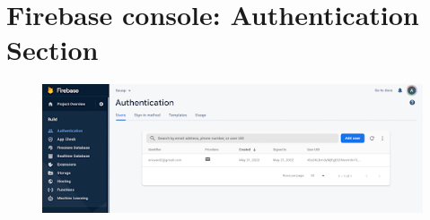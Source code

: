 \chapter{Firebase console: Authentication Section}\label{app:B}
\label{app:appendixB}


\begin{figure}[h]
    \centering
    \includegraphics[scale=0.9]{figures/iOS/ios6.png}
    \label{fig:appendix1}
\end{figure}
